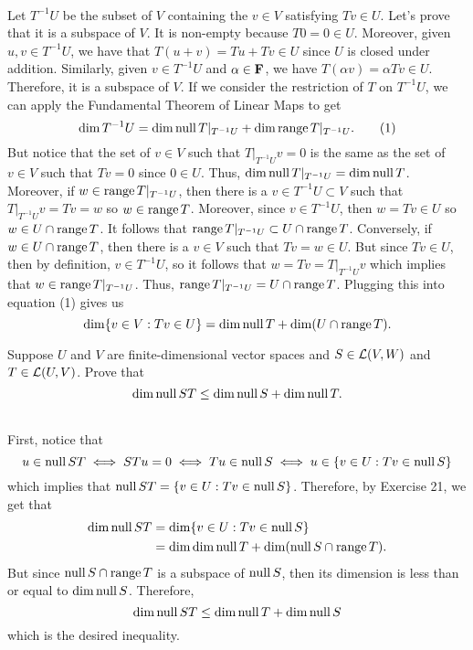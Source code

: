 \begin{solution}
    \\ Let $T^{-1}U$ be the subset of $V$ containing the $v \in V$ satisfying $Tv \in U$. Let's prove that it is a subspace of $V$. It is non-empty because $T0 = 0 \in U$. Moreover, given $u,v \in T^{-1}U$, we have that $T(u+v) = Tu + Tv \in U$ since $U$ is closed under addition. Similarly, given $v \in T^{-1}U$ and $\alpha \in \mathbf{F}$, we have $T(\alpha v) = \alpha Tv \in U$. Therefore, it is a subspace of $V$. If we consider the restriction of $T$ on $T^{-1}U$, we can apply the Fundamental Theorem of Linear Maps to get
    \[ \dim T^{-1}U = \dim \operatorname{\text{null}} T|_{T^{-1}U} + \dim \operatorname{\text{range}} T|_{T^{-1}U}. \tag*{(1)} \]
    But notice that the set of $v \in V$ such that $T|_{T^{-1}U}v = 0$ is the same as the set of $v \in V$ such that $Tv = 0$ since $0 \in U$. Thus, $\dim \operatorname{\text{null}} T|_{T^{-1}U} = \dim \operatorname{\text{null}} T$. Moreover, if $w \in \operatorname{\text{range}} T|_{T^{-1}U}$, then there is a $v \in T^{-1}U \subset V$ such that $T|_{T^{-1}U}v = Tv = w$ so $w \in \operatorname{\text{range}} T$. Moreover, since $v \in T^{-1}U$, then $w = Tv \in U$ so $w \in U \cap \operatorname{\text{range}} T$. It follows that $\operatorname{\text{range}} T|_{T^{-1}U} \subset U \cap \operatorname{\text{range}} T$. Conversely, if $w \in U \cap \operatorname{\text{range}} T$, then there is a $v \in V$ such that $Tv = w \in U$. But since $Tv \in U$, then by definition, $v \in T^{-1}U$, so it follows that $w = Tv = T|_{T^{-1}U}v$ which implies that $w \in \operatorname{\text{range}} T|_{T^{-1}U}$. Thus, $\operatorname{\text{range}} T|_{T^{-1}U} = U \cap \operatorname{\text{range}} T$. Plugging this into equation (1) gives us
    $$\dim \{v \in V : Tv \in U\} = \dim \operatorname{\text{null}} T + \dim(U \cap \operatorname{\text{range}} T).$$
\end{solution}

\begin{exercise}
    Suppose $U$ and $V$ are finite-dimensional vector spaces and $S \in \mathcal{L}(V,W)$ and $T \in \mathcal{L}(U,V)$. Prove that
    $$\dim \operatorname{\text{null}} ST \leq \dim \operatorname{\text{null}} S + \dim \operatorname{\text{null}} T.$$
\end{exercise}

\begin{solution}
    \\ First, notice that 
    $$u \in \operatorname{\text{null}} ST \iff STu = 0 \iff Tu \in \operatorname{\text{null}} S \iff u \in \{v \in U : Tv \in \operatorname{\text{null}} S\}$$
    which implies that $\operatorname{\text{null}} ST = \{v \in U : Tv \in \operatorname{\text{null}} S\}$. Therefore, by Exercise 21, we get that
    \begin{align*}
        \dim \operatorname{\text{null}} ST &= \dim \{v \in U : Tv \in \operatorname{\text{null}} S\} \\
        &= \dim \dim \operatorname{\text{null}} T + \dim(\operatorname{\text{null}} S \cap \operatorname{\text{range}} T).
    \end{align*}
    But since $\operatorname{\text{null}} S \cap \operatorname{\text{range}} T$ is a subspace of $\operatorname{\text{null}} S$, then its dimension is less than or equal to $\dim \operatorname{\text{null}} S$. Therefore,
    $$\dim \operatorname{\text{null}} ST \leq \dim \operatorname{\text{null}} T + \dim \operatorname{\text{null}} S$$
    which is the desired inequality.\\
\end{solution}

